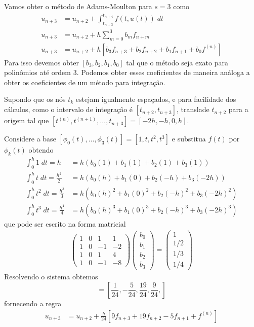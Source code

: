 \begin{ex}
Vamos obter o método de Adams-Moulton para $s=3$ como
\begin{eqnarray}\label{AM4}
  u_{n+3}  &= u_{n+2}  + \int _{t_{n+3}}^{t_{n+4}} f(t,u(t)) \; dt \\
  u_{n+3}  &= u_{n+2}  + h \sum_{m=0}^{3} b_m f_{n+m} \\
  u_{n+3}  &= u_{n+2}  + h [b_3f_{n+3} +b_2f_{n+2} +b_1f_{n+1} +b_0f^{(n)}]
\end{eqnarray}
Para isso devemos obter $[b_3,b_2,b_1,b_0]$ tal que o método seja exato para polinômios até ordem $3$. Podemos obter esses coeficientes de maneira análoga a obter os coeficientes de um método para integração.

Supondo que os nós $t_k$ estejam igualmente espaçados, e para facilidade dos cálculos, como o intervalo de integração é $[t_{n+2},t_{n+3}]$, translade $t_{n+2}$ para a origem tal que $[t^{(n)},t^{(n+1)},\ldots ,t_{n+3}]=[-2h,-h,0,h]$.

Considere a base $[\phi _0(t),\ldots ,\phi _3(t)]=[1, t, t^2, t^3]$ e substitua $f(t)$ por $\phi _k(t)$ obtendo
\begin{eqnarray*}
      \int _0^{h} 1  \;dt = h             &= h( b_0(1)  +b_1(1)   + b_2(1)   + b_3(1)    )\\
      \int _0^{h} t  \;dt = \frac{h^2}{2}  &= h( b_0(h)  +b_1(0)   + b_2(-h) + b_3(-2h)  )\\
      \int _0^{h} t^2 \;dt = \frac{h^3}{3}  &= h( b_0(h)^2 +b_1(0)^2  + b_2(-h)^2+ b_3(-2h)^2 )\\
      \int _0^{h} t^3 \;dt = \frac{h^4}{4} &= h( b_0(h)^3 +b_1(0)^3  + b_2(-h)^3+ b_3(-2h)^3 )
\end{eqnarray*}
que pode ser escrito na forma matricial
\begin{eqnarray}
\left(
  \begin{array}{cccc}
    1  & 0 & 1    & 1   \\
    1  & 0 & -1   & -2  \\
    1  & 0 & 1    & 4   \\
    1  & 0 & -1   & -8
  \end{array}
\right)
\left(\begin{array}{c}  b_0 \\ b_1\\ b_2\\b_3   \end{array}\right)
=
\left(\begin{array}{c}  1  \\ 1/2 \\ 1/3 \\ 1/4  \end{array}\right)
\end{eqnarray}
Resolvendo o sistema obtemos
\begin{equation} [b_0,b_1,b_2,b_3]=[\frac{1}{24},-\frac{5}{24},\frac{19}{24},\frac{9}{24},] \end{equation}
fornecendo a regra
\begin{eqnarray}
  u_{n+3}  &= u_{n+2}  + \frac{h}{24} [9 f_{n+3} +19f_{n+2} -5f_{n+1} +f^{(n)}]
\end{eqnarray}
\end{ex}

